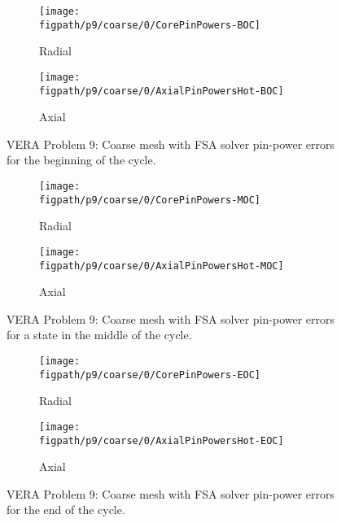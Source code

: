 {{{      \begin{figure}[htbp]
        \centering
        \begin{subfigure}[t]{0.425\textwidth}
          \centering
          \texttt{[image: \\figpath/p9/coarse/0/CorePinPowers-BOC]}
          \caption{Radial\label{fig:LSMOC:P9:Coarse-FS:CorePinPowers:BOC}}
        \end{subfigure}%
        \begin{subfigure}[t]{0.425\textwidth}
          \centering
            \texttt{[image: \\figpath/p9/coarse/0/AxialPinPowersHot-BOC]}
            \caption{Axial\label{fig:LSMOC:P9:Coarse-FS:AxialPinPowers:BOC}}
        \end{subfigure}
        \caption{VERA Problem 9: Coarse mesh with FSA solver pin-power errors for the beginning of the cycle.\label{figs:LSMOC:P9:Coarse-FS:PinPowers:BOC}}
        \begin{subfigure}[t]{0.425\textwidth}
          \centering
          \texttt{[image: \\figpath/p9/coarse/0/CorePinPowers-MOC]}
          \caption{Radial\label{fig:LSMOC:P9:Coarse-FS:CorePinPowers:MOC}}
        \end{subfigure}%
        \begin{subfigure}[t]{0.425\textwidth}
          \centering
            \texttt{[image: \\figpath/p9/coarse/0/AxialPinPowersHot-MOC]}
            \caption{Axial\label{fig:LSMOC:P9:Coarse-FS:AxialPinPowers:MOC}}
        \end{subfigure}
        \caption{VERA Problem 9: Coarse mesh with FSA solver pin-power errors for a state in the middle of the cycle.\label{figs:LSMOC:P9:Coarse-FS:PinPowers:MOC}}
        \begin{subfigure}[t]{0.425\textwidth}
          \centering
          \texttt{[image: \\figpath/p9/coarse/0/CorePinPowers-EOC]}
          \caption{Radial\label{fig:LSMOC:P9:Coarse-FS:CorePinPowers:EOC}}
        \end{subfigure}%
        \begin{subfigure}[t]{0.425\textwidth}
          \centering
            \texttt{[image: \\figpath/p9/coarse/0/AxialPinPowersHot-EOC]}
            \caption{Axial\label{fig:LSMOC:P9:Coarse-FS:AxialPinPowers:EOC}}
        \end{subfigure}
        \caption{VERA Problem 9: Coarse mesh with FSA solver pin-power errors for the end of the cycle.\label{figs:LSMOC:P9:Coarse-FS:PinPowers:EOC}}
      \end{figure}

}}}
